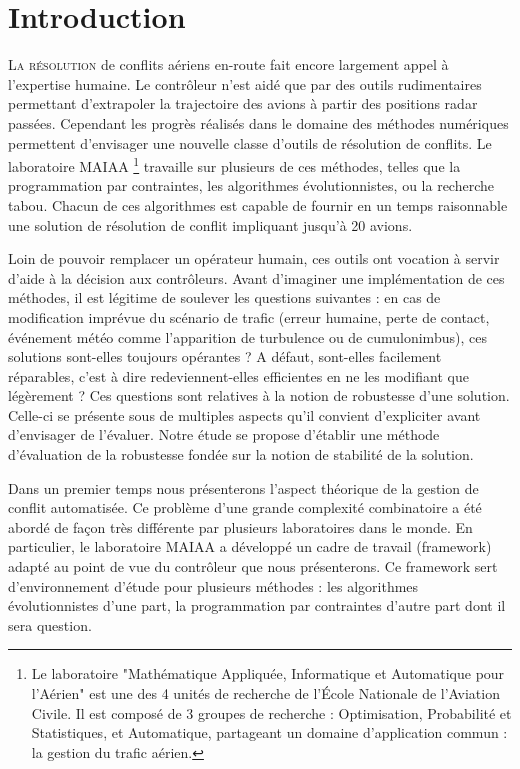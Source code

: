 \chapter*{Introduction}

\lettrine{L}{a résolution} de conflits aériens en-route fait encore largement appel à l'expertise humaine. Le contrôleur n'est aidé que par des outils rudimentaires permettant d'extrapoler la trajectoire des avions à partir des positions radar passées. Cependant les progrès réalisés dans le domaine des méthodes numériques permettent d'envisager une nouvelle classe d'outils de résolution de conflits. Le laboratoire MAIAA \footnote{Le laboratoire "Mathématique Appliquée, Informatique et Automatique pour l'Aérien" est une des 4 unités de recherche de l'École Nationale de l'Aviation Civile. Il est composé de 3 groupes de recherche : Optimisation, Probabilité et Statistiques, et Automatique, partageant un domaine d'application commun : la gestion du trafic aérien.} travaille sur plusieurs de ces méthodes, telles que la programmation par contraintes, les algorithmes évolutionnistes, ou la recherche tabou. Chacun de ces algorithmes est capable de fournir en un temps raisonnable une solution de résolution de conflit impliquant jusqu'à 20 avions.

Loin de pouvoir remplacer un opérateur humain, ces outils ont vocation à servir d'aide à la décision aux contrôleurs. Avant d'imaginer une implémentation de ces méthodes, il est légitime de soulever les questions suivantes : en cas de modification imprévue du scénario de trafic (erreur humaine, perte de contact, événement météo comme l'apparition de turbulence ou de cumulonimbus), ces solutions sont-elles toujours opérantes ? A défaut, sont-elles facilement réparables, c'est à dire redeviennent-elles efficientes en ne les modifiant que légèrement ?
Ces questions sont relatives à la notion de robustesse d'une solution. Celle-ci se présente sous de multiples aspects qu'il convient d'expliciter avant d'envisager de l'évaluer. Notre étude se propose d'établir une méthode d'évaluation de la robustesse fondée sur la notion de stabilité de la solution. 

Dans un premier temps nous présenterons l'aspect théorique de la gestion de conflit automatisée. Ce problème d'une grande complexité combinatoire a été abordé de façon très différente par plusieurs laboratoires dans le monde. En particulier, le laboratoire MAIAA a développé un cadre de travail (framework) adapté au point de vue du contrôleur que nous présenterons. Ce framework sert d'environnement d'étude pour plusieurs méthodes : les algorithmes évolutionnistes d'une part, la programmation par contraintes d'autre part dont il sera question.

